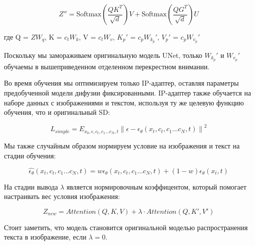 \documentclass{article}
\begin{document}
\[ Z'' = \text{Softmax}\left(\frac{QK^T}{\sqrt{d}}\right)V + \text{Softmax}\left(\frac{QG^T}{\sqrt{d}}\right)U \]

где Q = \(ZW_q\), K = \(c_tW_k\), V = \(c_tW_v\), \(K_p'\) = \(c_pW_k_p'\),  \(V_p'\) = \(c_pW_v_p'\)

Поскольку мы замораживаем оригинальную модель UNet, только \(W_k_p'\) и \(W_v_p'\) обучаемы в вышеприведенном отделенном перекрестном внимании.

Во время обучения мы оптимизируем только IP-адаптер, оставляя параметры предобученной модели дифузии фиксированными. IP-адаптер также обучается на наборе данных с изображениями и текстом, используя ту же целевую функцию обучения, что и оригинальный SD:

\[
L_{simple} = E_{x_{0},\epsilon,c_{t},c_1 ... c_N,t} \left\| \epsilon - \epsilon_{\theta}(x_{t},c_{t},c_1 ... c_N,t) \right\|^2
\]

Мы также случайным образом нормируем условие на изображения и текст на стадии обучения:

\[
\hat{\epsilon_{\theta}}(x_{t}, c_{t},c_1 ... c_N, t) = w \epsilon_{\theta}(x_{t}, c_{t},c_1 ... c_N, t) + (1 - w) \epsilon_{\theta}(x_{t}, t)
\]

На стадии вывода \(\lambda\) является нормировочным коэффицентом, который помогает настраивать вес условия изображения:

\[
Z_{new} = Attention(Q,K,V) + \lambda \cdot Attention(Q,K',V')
\]

Стоит заметить, что модель становится оригинальной моделью распространения текста в изображение, если $\lambda = 0$.
\end{document}
